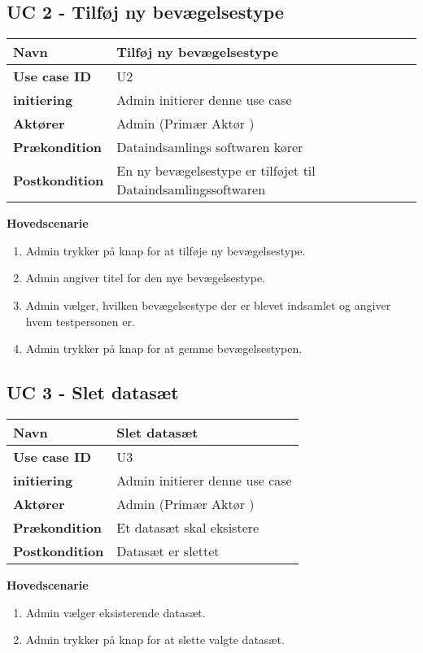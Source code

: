\subsection{UC 2 - Tilføj ny bevægelsestype}
\begin{table}[htbp] 
	\begin{tabular}{|p{5cm}|p{9cm}|}
		\hline
		\textbf{Navn} & Tilføj ny bevægelsestype \\ \hline
		\textbf{Use case ID} & U2 \\ \hline
		\textbf{initiering} & Admin initierer denne use case \\ \hline
		\textbf{Aktører} & Admin (Primær Aktør ) \\ \hline
		\textbf{Prækondition} & Dataindsamlings softwaren kører \\ \hline
		\textbf{Postkondition} & En ny bevægelsestype er tilføjet til Dataindsamlingssoftwaren \\ \hline
	\end{tabular}
\end{table}
\textbf{Hovedscenarie}
\begin{enumerate}
	\item Admin trykker på knap for at tilføje ny bevægelsestype.
	\item Admin angiver titel for den nye bevægelsestype.
	\item Admin vælger, hvilken bevægelsestype der er blevet indsamlet og angiver hvem testpersonen er.
	\item Admin trykker på knap for at gemme bevægelsestypen.
\end{enumerate}

\subsection{UC 3 - Slet datasæt}
\begin{table}[htbp] 
	\begin{tabular}{|p{5cm}|p{9cm}|}
		\hline
		\textbf{Navn} & Slet datasæt \\ \hline
		\textbf{Use case ID} & U3 \\ \hline
		\textbf{initiering} & Admin initierer denne use case \\ \hline
		\textbf{Aktører} & Admin (Primær Aktør ) \\ \hline
		\textbf{Prækondition} & Et datasæt skal eksistere \\ \hline
		\textbf{Postkondition} & Datasæt er slettet \\ \hline
	\end{tabular}
\end{table}
\textbf{Hovedscenarie}
\begin{enumerate}
	\item Admin vælger eksisterende datasæt.
	\item Admin trykker på knap for at slette valgte datasæt.
\end{enumerate}
\newpage
